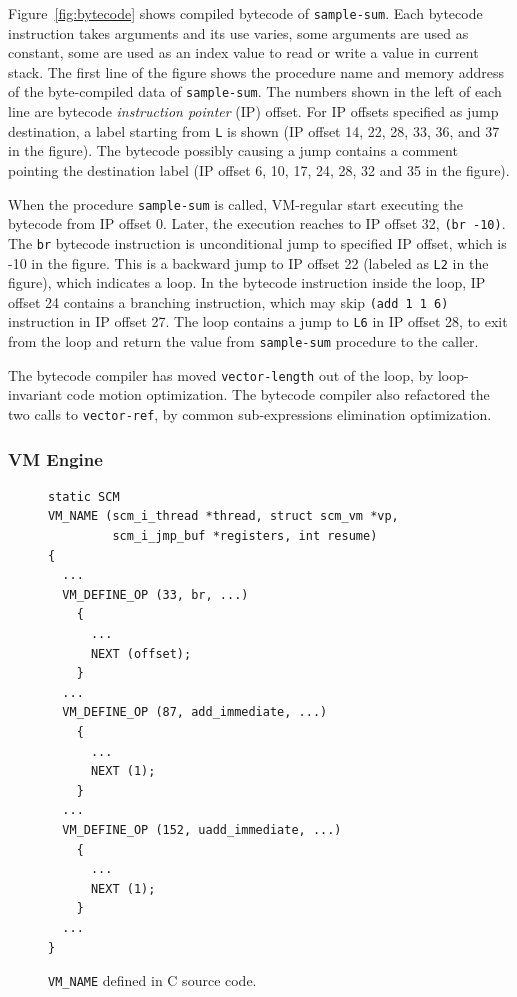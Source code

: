 \documentclass[preprint, 10pt]{sigplanconf}
\begin{document}
Figure~\hyperref[fig:bytecode]{\ref{fig:bytecode}} shows compiled bytecode of
\texttt{sample-sum}. Each bytecode instruction takes arguments and its use
varies, some arguments are used as constant, some are used as an index value to
read or write a value in current stack. The first line of the figure shows the
procedure name and memory address of the byte-compiled data of
\texttt{sample-sum}. The numbers shown in the left of each line are bytecode
\textit{instruction pointer} (IP) offset. For IP offsets specified as jump
destination, a label starting from \texttt{L} is shown (IP offset 14, 22, 28,
33, 36, and 37 in the figure). The bytecode possibly causing a jump contains a
comment pointing the destination label (IP offset 6, 10, 17, 24, 28, 32 and 35
in the figure).

When the procedure \texttt{sample-sum} is called, VM-regular start executing the
bytecode from IP offset 0. Later, the execution reaches to IP offset 32,
\texttt{(br -10)}. The \texttt{br} bytecode instruction is unconditional jump to
specified IP offset, which is -10 in the figure. This is a backward jump to IP
offset 22 (labeled as \texttt{L2} in the figure), which indicates a loop. In the
bytecode instruction inside the loop, IP offset 24 contains a branching
instruction, which may skip \texttt{(add 1 1 6)} instruction in IP offset
27. The loop contains a jump to \texttt{L6} in IP offset 28, to exit from the
loop and return the value from \texttt{sample-sum} procedure to the caller.

The bytecode compiler has moved \texttt{vector-length} out of the loop, by
loop-invariant code motion optimization. The bytecode compiler also refactored
the two calls to \texttt{vector-ref}, by common sub-expressions elimination
optimization.

\subsubsection{VM Engine}
\label{sec:guilevmengine}

\begin{figure}
  \centering
  \small
\begin{verbatim}
static SCM
VM_NAME (scm_i_thread *thread, struct scm_vm *vp,
         scm_i_jmp_buf *registers, int resume)
{
  ...
  VM_DEFINE_OP (33, br, ...)
    {
      ...
      NEXT (offset);
    }
  ...
  VM_DEFINE_OP (87, add_immediate, ...)
    {
      ...
      NEXT (1);
    }
  ...
  VM_DEFINE_OP (152, uadd_immediate, ...)
    {
      ...
      NEXT (1);
    }
  ...
}
\end{verbatim}
\caption{\texttt{VM\_NAME} defined in C source code.}
\label{fig:vmnameorig}
\end{figure}
\end{document}
